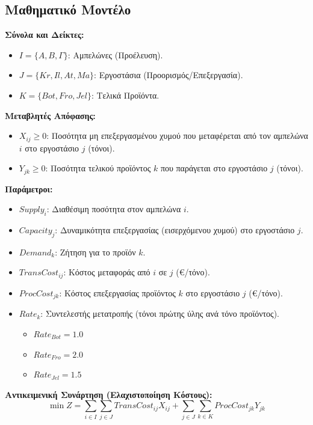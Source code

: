 \documentclass[12pt, a4paper]{article}
\begin{document}
\subsection*{Μαθηματικό Μοντέλο}

\textbf{Σύνολα και Δείκτες:}
\begin{itemize}
    \item $I = \{A, B, \Gamma\}$: Αμπελώνες (Προέλευση).
    \item $J = \{Kr, Il, At, Ma\}$: Εργοστάσια (Προορισμός/Επεξεργασία).
    \item $K = \{Bot, Fro, Jel\}$: Τελικά Προϊόντα.
\end{itemize}

\textbf{Μεταβλητές Απόφασης:}
\begin{itemize}
    \item $X_{ij} \ge 0$: Ποσότητα μη επεξεργασμένου χυμού που μεταφέρεται από τον αμπελώνα $i$ στο εργοστάσιο $j$ (τόνοι).
    \item $Y_{jk} \ge 0$: Ποσότητα τελικού προϊόντος $k$ που παράγεται στο εργοστάσιο $j$ (τόνοι).
\end{itemize}

\textbf{Παράμετροι:}
\begin{itemize}
    \item $Supply_i$: Διαθέσιμη ποσότητα στον αμπελώνα $i$.
    \item $Capacity_j$: Δυναμικότητα επεξεργασίας (εισερχόμενου χυμού) στο εργοστάσιο $j$.
    \item $Demand_k$: Ζήτηση για το προϊόν $k$.
    \item $TransCost_{ij}$: Κόστος μεταφοράς από $i$ σε $j$ (€/τόνο).
    \item $ProcCost_{jk}$: Κόστος επεξεργασίας προϊόντος $k$ στο εργοστάσιο $j$ (€/τόνο).
    \item $Rate_k$: Συντελεστής μετατροπής (τόνοι πρώτης ύλης ανά τόνο προϊόντος).
    \begin{itemize}
        \item $Rate_{Bot} = 1.0$
        \item $Rate_{Fro} = 2.0$
        \item $Rate_{Jel} = 1.5$
    \end{itemize}
\end{itemize}

\textbf{Αντικειμενική Συνάρτηση (Ελαχιστοποίηση Κόστους):}
$$ \min Z = \sum_{i \in I} \sum_{j \in J} TransCost_{ij} X_{ij} + \sum_{j \in J} \sum_{k \in K} ProcCost_{jk} Y_{jk} $$
\end{document}
